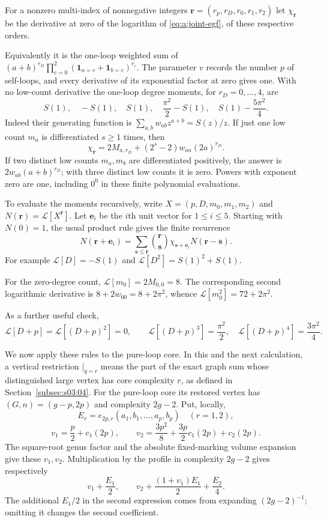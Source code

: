 \documentclass[a4paper,10pt]{article}
\numberwithin{equation}{section}
\theoremstyle{paperplain}
\theoremstyle{paperremark}
\theoremstyle{paperplain}
\begin{document}
For a nonzero multi-index of nonnegative integers
$\mathbf r=(r_p,r_D,r_0,r_1,r_2)$ let
$\chi_{\mathbf r}$ be the derivative at zero of the logarithm of
\eqref{eq:a:joint-egf}, of these respective orders.

Equivalently it is
the one-loop weighted sum of
$(a+b)^{r_D}\prod_{c=0}^2(\mathbf1_{a=c}+\mathbf1_{b=c})^{r_c}$.
The parameter $v$ records the number $p$ of self-loops, and every
derivative of its exponential factor at zero gives one.
With no low-count
derivative the one-loop degree moments, for $r_D=0,\ldots,4$, are
\begin{equation}\label{eq:a:degree-cumulants}
 S(1),\quad -S(1),\quad S(1),\quad
 \frac{\pi^2}{2}-S(1),\quad S(1)-\frac{5\pi^2}{4}.
\end{equation}
Indeed their generating function is
$\sum_{a,b}w_{ab}z^{a+b}=S(z)/z$.
If just one low count $m_a$ is differentiated $s\geq1$ times, then
\[
 \chi_{\mathbf r}=2M_{a,r_D}
        +(2^s-2)w_{aa}(2a)^{r_D}.
\]
If two distinct low counts $m_a,m_b$ are differentiated positively,
the answer is $2w_{ab}(a+b)^{r_D}$; with three distinct low counts it
is zero. Powers with exponent zero are one, including $0^0$ in these
finite polynomial evaluations.

To evaluate the moments recursively, write $X=(p,D,m_0,m_1,m_2)$ and
$N(\mathbf r)=\mathcal L[X^{\mathbf r}]$. Let $\mathbf e_i$ be
the $i$th unit vector for $1\leq i\leq5$. Starting with $N(0)=1$,
the usual product rule gives the finite recurrence
\begin{equation}\label{eq:a:bell-rule}
 N(\mathbf r+\mathbf e_i)=
 \sum_{\mathbf s\leq\mathbf r}\binom{\mathbf r}{\mathbf s}
       \chi_{\mathbf s+\mathbf e_i}N(\mathbf r-\mathbf s).
\end{equation}
For example $\mathcal L[D]=-S(1)$ and
$\mathcal L[D^2]=S(1)^2+S(1)$.

For the zero-degree count, $\mathcal L[m_0]=2M_{0,0}=8$.
The corresponding second logarithmic derivative is
$8+2w_{00}=8+2\pi^2$, whence
$\mathcal L[m_0^2]=72+2\pi^2$.

As a further useful check,
\[
 \mathcal L[D+p]=\mathcal L[(D+p)^2]=0,\qquad
 \mathcal L[(D+p)^3]=\frac{\pi^2}{2},\quad
 \mathcal L[(D+p)^4]=\frac{3\pi^2}{4}.
\]

We now apply these rules to the pure-loop core. In this and the next
calculation, a vertical restriction $\big|_{q=r}$ means the part of
the exact graph sum whose distinguished large vertex has core
complexity $r$, as defined in Section~\ref{subsec:s03:04}.
For the pure-loop core its restored vertex has $(G,n)=(g-p,2p)$ and
complexity $2g-2$. Put, locally,
\[
 E_r=e_{2p,r}(a_1,b_1,\ldots,a_p,b_p)\quad(r=1,2),
\]
\[
 v_1=\frac p2+c_1(2p),\qquad
 v_2=\frac{3p^2}{8}+\frac{3p}{2}c_1(2p)+c_2(2p).
\]
The square-root genus factor and the absolute fixed-marking volume
expansion give these $v_1,v_2$. Multiplication by the profile in
complexity $2g-2$ gives respectively
\begin{equation}\label{eq:a:pure-loop-polynomials}
 v_1+\frac{E_1}{2},\qquad
 v_2+\frac{(1+v_1)E_1}{2}+\frac{E_2}{4}.
\end{equation}
The additional $E_1/2$ in the second expression comes from expanding
$(2g-2)^{-1}$; omitting it changes the second coefficient.
\end{document}
